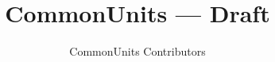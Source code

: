 \documentclass[a4paper]{report}
\title{CommonUnits --- Draft}
\author{CommonUnits Contributors}
\begin{document}
\begin{titlepage}
\maketitle
\thispagestyle{empty}
\end{titlepage}

\tableofcontents
  
  
  
  
\end{document}
